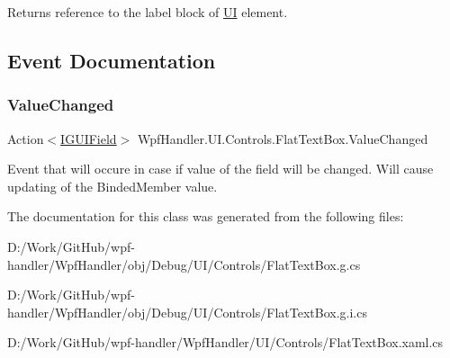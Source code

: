 Returns reference to the label block of \mbox{\hyperlink{namespace_wpf_handler_1_1_u_i}{UI}} element. 



\subsection{Event Documentation}
\mbox{\label{class_wpf_handler_1_1_u_i_1_1_controls_1_1_flat_text_box_a105a5e83858eda13ef8010240747203e}} 
\subsubsection{\texorpdfstring{Value\+Changed}{ValueChanged}}
{\footnotesize\ttfamily Action$<$\mbox{\hyperlink{interface_wpf_handler_1_1_u_i_1_1_auto_layout_1_1_i_g_u_i_field}{I\+G\+U\+I\+Field}}$>$ Wpf\+Handler.\+U\+I.\+Controls.\+Flat\+Text\+Box.\+Value\+Changed}



Event that will occure in case if value of the field will be changed. Will cause updating of the Binded\+Member value. 



The documentation for this class was generated from the following files\+:\begin{DoxyCompactItemize}
\item 
D\+:/\+Work/\+Git\+Hub/wpf-\/handler/\+Wpf\+Handler/obj/\+Debug/\+U\+I/\+Controls/Flat\+Text\+Box.\+g.\+cs\item 
D\+:/\+Work/\+Git\+Hub/wpf-\/handler/\+Wpf\+Handler/obj/\+Debug/\+U\+I/\+Controls/Flat\+Text\+Box.\+g.\+i.\+cs\item 
D\+:/\+Work/\+Git\+Hub/wpf-\/handler/\+Wpf\+Handler/\+U\+I/\+Controls/Flat\+Text\+Box.\+xaml.\+cs\end{DoxyCompactItemize}
